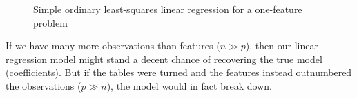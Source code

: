 \begin{figure}
  \centering
  \hspace*{1cm}%
  \caption{%
    Simple ordinary least-squares linear regression for a one-feature problem}
  \label{fig:ols}
\end{figure}

If we have many more observations than features (\(n \gg p\)), then our linear regression model might stand a decent chance of recovering the true model (coefficients). But if the tables were turned and the features instead outnumbered the observations (\(p \gg n\)), the model would in fact break down.

